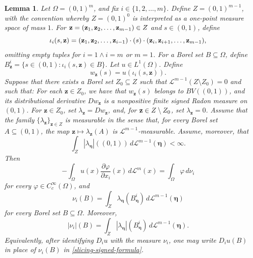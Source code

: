 \documentclass{publicadapt}
\newtheorem{lemma}{Lemma}%
\begin{document}
\begin{lemma}\label{lem:slicing-partial-variation}%
 Let $\Omega=(0,1)^m$, and fix \(i\in\{1,2,\ldots,m\}\). Define $ Z=(0,1)^{m-1}$, with the convention  whereby  $Z=(0,1)^0$ is interpreted as a
 one-point measure space of mass $1$. For $  \text{{\bf z}} = (\mathbf z_1,\mathbf z_2,\ldots,\mathbf z_{m-1}) \in Z $
and \(s\in(0,1)\), define
\begin{equation}\label{defineiota}
\iota_i(s,\mathbf z)
= (\mathbf z_1,\mathbf z_2,\ldots,\mathbf z_{i-1}) \cdot 
(s) \cdot ( \text{{\bf z}}_i,\mathbf z_{i+1},\ldots,\mathbf z_{m-1}),
\end{equation}
  omitting empty tuples              for  $i = 1 \wedge i=m$ or
\(m=1\). For a Borel set \(B\subseteq\Omega\), define
$
B_{\mathbf z}^{i}
=
\{s\in(0,1):\iota_i(s,\mathbf z)\in B\}$.
 Let \(u\in L^1(\Omega)\). Define 
\begin{equation}\label{wbfs}
 w_{\mathbf z}(s)=u(\iota_i(s,\mathbf z)). 
\end{equation}
 Suppose that there exists a Borel set
\(Z_0\subseteq Z\) such that $ \mathcal L^{m-1}(Z\setminus Z_0)=0 $ and such that:  For each \(\mathbf z\in Z_0\), we have that 
 $w_{\mathbf z}(s) $ 
belongs to \(BV((0,1))\), and its distributional derivative \(Dw_{\mathbf z}\)
is a nonpositive finite signed Radon measure on \((0,1)\).
For \(\mathbf z\in Z_0\), set
$
\lambda_{\mathbf z}=Dw_{\mathbf z}$, 
and, for $ \text{{\bf z}} \in Z\setminus Z_0$, set
$
\lambda_{\mathbf z}=0$.
Assume that the family \(\{\lambda_{\mathbf z}\}_{\mathbf z\in Z}\) is
measurable in the sense that, for every Borel set \(A\subseteq(0,1)\), the map
$
\mathbf z\mapsto \lambda_{\mathbf z}(A) $
 is $\mathcal{L}^{m-1}$-measurable. Assume, moreover, that
\begin{equation}\label{slicing-integrability-condition}
\int_Z
|\lambda_{\boldsymbol\eta}|((0,1))
\,d\mathcal L^{m-1}(\boldsymbol\eta)
<\infty.
\end{equation}
 Then 
$$
-\int_\Omega u(x)\frac{\partial\varphi}{\partial x_i}(x)\,
d\mathcal L^m(x)
=
\int_\Omega \varphi\,d\nu_i
$$
for every \(\varphi\in C_c^\infty(\Omega)\), and   
\begin{equation}\label{slicing-signed-formula}
\nu_i(B) =   \int_Z
\lambda_{\boldsymbol\eta}(B_{\boldsymbol\eta}^{i})
\,d\mathcal L^{m-1}(\boldsymbol\eta) 
\end{equation}
 for every Borel set
$B\subseteq\Omega$.  Moreover,
\begin{equation}\label{slicing-variation-formula}
|\nu_i|(B)
=
\int_Z
|\lambda_{\boldsymbol\eta}|(B_{\boldsymbol\eta}^{i})
\,d\mathcal L^{m-1}(\boldsymbol\eta).
\end{equation}
Equivalently, after identifying \(D_i u\) with the measure \(\nu_i\), one may
write \(D_i u(B)\) in place of \(\nu_i(B)\) in
\eqref{slicing-signed-formula}.
\end{lemma}
\end{document}
